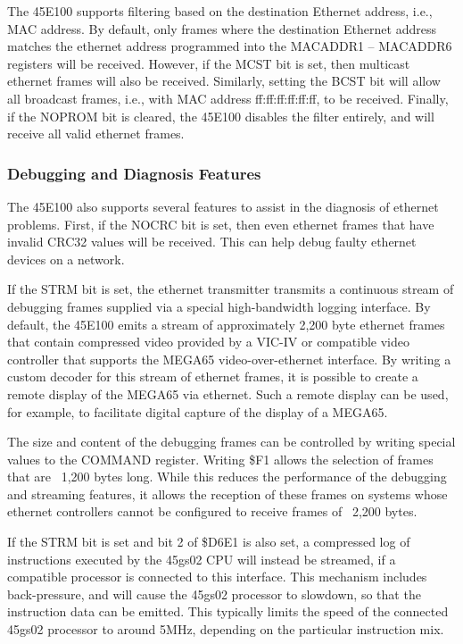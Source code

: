 The 45E100 supports filtering based on the destination Ethernet address, i.e., MAC address.
By default, only frames where the destination Ethernet address matches the ethernet address
programmed into the MACADDR1 -- MACADDR6 registers will be received. However, if the MCST bit
is set, then multicast ethernet frames will also be received. Similarly, setting the BCST bit
will allow all broadcast frames, i.e., with MAC address ff:ff:ff:ff:ff:ff, to be received.
Finally, if the NOPROM bit is cleared, the 45E100 disables the filter entirely, and will
receive all valid ethernet frames.

\subsubsection{Debugging and Diagnosis Features}

The 45E100 also supports several features to assist in the diagnosis of ethernet problems.
First, if the NOCRC bit is set, then even ethernet frames that have invalid CRC32 values
will be received. This can help debug faulty ethernet devices on a network.

If the STRM bit is set, the ethernet transmitter transmits a continuous stream of debugging frames
supplied via a special high-bandwidth logging interface. By default, the 45E100 emits a
stream of approximately 2,200 byte ethernet frames that contain compressed video provided
by a VIC-IV or compatible video controller that supports the MEGA65 video-over-ethernet
interface.  By writing a custom decoder for this stream of ethernet frames, it is possible
to create a remote display of the MEGA65 via ethernet. Such a remote display can be used,
for example, to facilitate digital capture of the display of a MEGA65.

The size and content of the debugging frames can be controlled by writing special values to the
COMMAND register.  Writing \$F1 allows the selection of frames that are ~1,200 bytes long.
While this reduces the performance of the debugging and streaming features, it allows the reception
of these frames on systems whose ethernet controllers cannot be configured to receive frames
of ~2,200 bytes.

If the STRM bit is set and bit 2 of \$D6E1 is also set, a compressed log of instructions executed by
the 45gs02 CPU will instead be streamed, if a compatible processor is connected to this interface.
This mechanism includes back-pressure, and will cause the 45gs02 processor to slowdown,
so that the instruction data can be emitted.  This typically limits the speed of the connected
45gs02 processor to around 5MHz, depending on the particular instruction mix.

